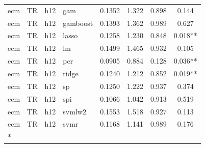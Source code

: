 \begin{ThreePartTable}
\begin{longtable}[t]{llclcccc}
ecm & TR & h12 & gam & 0.1352 & 1.322 & 0.898 & 0.144\\
ecm & TR & h12 & gamboost & 0.1393 & 1.362 & 0.989 & 0.627\\
ecm & TR & h12 & lasso & 0.1258 & 1.230 & 0.848 & 0.018**\\
ecm & TR & h12 & lm & 0.1499 & 1.465 & 0.932 & 0.105\\
ecm & TR & h12 & pcr & 0.0905 & 0.884 & 0.128 & 0.036**\\
ecm & TR & h12 & ridge & 0.1240 & 1.212 & 0.852 & 0.019**\\
ecm & TR & h12 & sp & 0.1250 & 1.222 & 0.937 & 0.374\\
ecm & TR & h12 & spi & 0.1066 & 1.042 & 0.913 & 0.519\\
ecm & TR & h12 & svmlw2 & 0.1553 & 1.518 & 0.927 & 0.113\\
ecm & TR & h12 & svmr & 0.1168 & 1.141 & 0.989 & 0.176\\*
\end{longtable}
\end{ThreePartTable}
\endgroup{}
